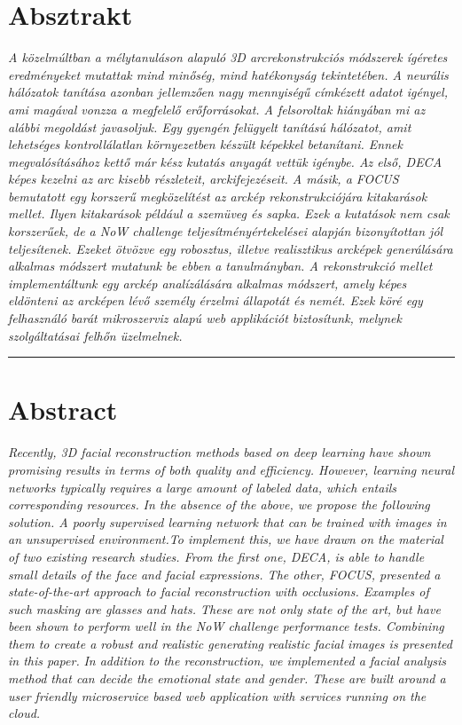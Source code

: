 \documentclass[12pt,a4]{article}
\begin{document}
	\section*{Absztrakt}
     \emph{
		A közelmúltban a mélytanuláson alapuló 3D arcrekonstrukciós módszerek
		ígéretes eredményeket mutattak mind minőség, mind hatékonyság tekintetében. A neurális hálózatok tanítása azonban jellemzően nagy mennyiségű címkézett
		adatot igényel, ami magával vonzza a megfelelő erőforrásokat.
		A felsoroltak hiányában mi az alábbi megoldást javasoljuk. Egy gyengén
		felügyelt tanítású hálózatot, amit lehetséges kontrollálatlan környezetben készült képekkel betanítani.
		Ennek megvalósításához kettő már kész kutatás anyagát vettük igénybe. Az
		első, \cite{deca}DECA képes kezelni az arc kisebb részleteit, arckifejezéseit. A
		másik, a \cite{focus}FOCUS bemutatott egy korszerű megközelítést az arckép rekonstrukciójára kitakarások mellet. Ilyen kitakarások például a szemüveg és sapka. Ezek a kutatások nem csak korszerűek, de a NoW challenge teljesítményértekelései alapján bizonyítottan jól teljesítenek. Ezeket ötvözve egy robosztus, illetve realisztikus
		arcképek generálására alkalmas módszert mutatunk be ebben a tanulmányban.
		A rekonstrukció mellet implementáltunk egy arckép analízálására alkalmas módszert, amely képes eldönteni az arcképen lévő személy érzelmi
		állapotát és nemét. Ezek köré egy felhasználó barát mikroszerviz alapú web
		applikációt biztosítunk, melynek szolgáltatásai felhőn üzelmelnek.
		}
	\par\noindent\rule{\textwidth}{0.4pt}

    \section*{Abstract}
        \textit{Recently, 3D facial reconstruction methods based on deep learning have shown promising results in terms of both quality and efficiency. However, learning neural networks typically requires a large amount of labeled data, which entails corresponding resources.
        }
        \textit{In the absence of the above, we propose the following solution. A poorly supervised learning network that can be trained with images in an unsupervised environment.To implement this, we have drawn on the material of two existing research studies. From the first one, \cite{deca}DECA, is able to handle small details of the face and facial expressions. The other, \cite{focus}FOCUS, presented a state-of-the-art approach to facial reconstruction with occlusions. Examples of such masking are glasses and hats. These are not only state of the art, but have been shown to perform well in the NoW challenge performance tests. Combining them to create a robust and realistic generating realistic facial images is presented in this paper.}
        \textit{In addition to the reconstruction, we implemented a facial analysis method that can decide the emotional state and gender. These are built around a user friendly microservice based web application with services running on the cloud.}
     
\end{document}
